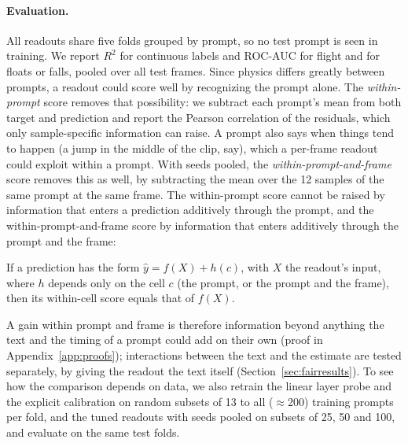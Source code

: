 \paragraph{Evaluation.} All readouts share five folds grouped by prompt, so no test prompt is seen in training. We report $R^2$ for continuous labels and ROC-AUC for flight and for floats or falls, pooled over all test frames. Since physics differs greatly between prompts, a readout could score well by recognizing the prompt alone. The \emph{within-prompt} score removes that possibility: we subtract each prompt's mean from both target and prediction and report the Pearson correlation of the residuals, which only sample-specific information can raise. A prompt also says when things tend to happen (a jump in the middle of the clip, say), which a per-frame readout could exploit within a prompt. With seeds pooled, the \emph{within-prompt-and-frame} score removes this as well, by subtracting the mean over the 12 samples of the same prompt at the same frame. The within-prompt score cannot be raised by information that enters a prediction additively through the prompt, and the within-prompt-and-frame score by information that enters additively through the prompt and the frame:
\begin{proposition}\label{prop:within}
If a prediction has the form $\hat y = f(X) + h(c)$, with $X$ the readout's input, where $h$ depends only on the cell $c$ (the prompt, or the prompt and the frame), then its within-cell score equals that of $f(X)$.
\end{proposition}
A gain within prompt and frame is therefore information beyond anything the text and the timing of a prompt could add on their own (proof in Appendix~\ref{app:proofs}); interactions between the text and the estimate are tested separately, by giving the readout the text itself (Section~\ref{sec:fairresults}). To see how the comparison depends on data, we also retrain the linear layer probe and the explicit calibration on random subsets of 13 to all ($\approx$200) training prompts per fold, and the tuned readouts with seeds pooled on subsets of 25, 50 and 100, and evaluate on the same test folds.

